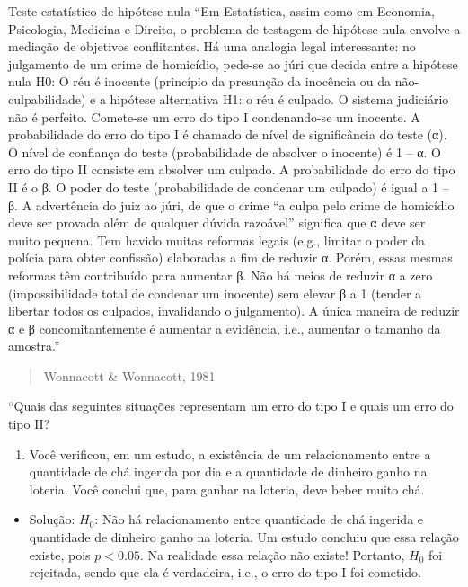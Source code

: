 \documentclass[
  ignorenonframetext,
]{beamer}
\providecommand{\tightlist}{%
  \setlength{\itemsep}{0pt}\setlength{\parskip}{0pt}}
\begin{document}
\begin{frame}{Teste estatístico de hipótese nula}
\protect\hypertarget{teste-estatuxedstico-de-hipuxf3tese-nula}{}
``Em Estatística, assim como em Economia, Psicologia, Medicina e
Direito, o problema de testagem de hipótese nula envolve a mediação de
objetivos conflitantes. Há uma analogia legal interessante: no
julgamento de um crime de homicídio, pede-se ao júri que decida entre a
hipótese nula H0: O réu é inocente (princípio da presunção da inocência
ou da não-culpabilidade) e a hipótese alternativa H1: o réu é culpado. O
sistema judiciário não é perfeito. Comete-se um erro do tipo I
condenando-se um inocente. A probabilidade do erro do tipo I é chamado
de nível de significância do teste (α). O nível de confiança do teste
(probabilidade de absolver o inocente) é 1 -- α. O erro do tipo II
consiste em absolver um culpado. A probabilidade do erro do tipo II é o
β. O poder do teste (probabilidade de condenar um culpado) é igual a 1
-- β. A advertência do juiz ao júri, de que o crime ``a culpa pelo crime
de homicídio deve ser provada além de qualquer dúvida razoável''
significa que α deve ser muito pequena. Tem havido muitas reformas
legais (e.g., limitar o poder da polícia para obter confissão)
elaboradas a fim de reduzir α. Porém, essas mesmas reformas têm
contribuído para aumentar β. Não há meios de reduzir α a zero
(impossibilidade total de condenar um inocente) sem elevar β a 1 (tender
a libertar todos os culpados, invalidando o julgamento). A única maneira
de reduzir α e β concomitantemente é aumentar a evidência, i.e.,
aumentar o tamanho da amostra.''

\begin{quote}
Wonnacott \& Wonnacott, 1981
\end{quote}

``Quais das seguintes situações representam um erro do tipo I e quais um
erro do tipo II?

\begin{enumerate}
\tightlist
\item
  Você verificou, em um estudo, a existência de um relacionamento entre
  a quantidade de chá ingerida por dia e a quantidade de dinheiro ganho
  na loteria. Você conclui que, para ganhar na loteria, deve beber muito
  chá.
\end{enumerate}

\begin{itemize}
\tightlist
\item
  Solução: \(H_{0}\): Não há relacionamento entre quantidade de chá
  ingerida e quantidade de dinheiro ganho na loteria. Um estudo concluiu
  que essa relação existe, pois \(p<0.05\). Na realidade essa relação
  não existe! Portanto, \(H_{0}\) foi rejeitada, sendo que ela é
  verdadeira, i.e., o erro do tipo I foi cometido.
\end{itemize}


\end{frame}
\end{document}
